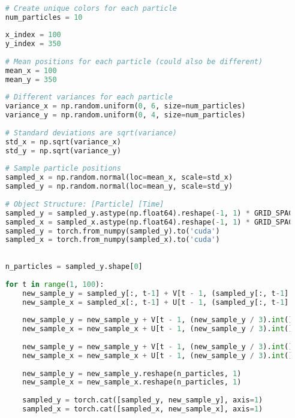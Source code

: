 \documentclass[11pt]{article}
\begin{document}
\begin{lstlisting}[language=Python, label=lst:debris-particles, caption={Simulating Random Debris Sampled from a Normal Gaussian Distribution with a Variety of Variances.}]

    # Create unique colors for each particle
    num_particles = 10
    
    x_index = 100
    y_index = 350
    
    # Mean positions for each particle (could also be different)
    mean_x = 100
    mean_y = 350
    
    # Different variances for each particle
    variance_x = np.random.uniform(0, 6, size=num_particles)
    variance_y = np.random.uniform(0, 4, size=num_particles)
    
    # Standard deviations are sqrt(variance)
    std_x = np.sqrt(variance_x)
    std_y = np.sqrt(variance_y)
    
    # Sample particle positions
    sampled_x = np.random.normal(loc=mean_x, scale=std_x)
    sampled_y = np.random.normal(loc=mean_y, scale=std_y)
    
    # Object Structure: [Particle] [Time]
    sampled_y = sampled_y.astype(np.float64).reshape(-1, 1) * GRID_SPACING_KM
    sampled_x = sampled_x.astype(np.float64).reshape(-1, 1) * GRID_SPACING_KM
    sampled_y = torch.from_numpy(sampled_y).to('cuda')
    sampled_x = torch.from_numpy(sampled_x).to('cuda')
    
    
    n_particles = sampled_y.shape[0]
    
    for t in range(1, 100):
        new_sample_y = sampled_y[:, t-1] + V[t - 1, (sampled_y[:, t-1] / 3).int(), (sampled_x[:, t-1] / 3).int()] # First Hour
        new_sample_x = sampled_x[:, t-1] + U[t - 1, (sampled_y[:, t-1] / 3).int(), (sampled_x[:, t-1] / 3).int()]
    
        new_sample_y = new_sample_y + V[t - 1, (new_sample_y / 3).int(), (new_sample_x / 3).int()] # Second Hour
        new_sample_x = new_sample_x + U[t - 1, (new_sample_y / 3).int(), (new_sample_x / 3).int()] # Second Hour
    
        new_sample_y = new_sample_y + V[t - 1, (new_sample_y / 3).int(), (new_sample_x / 3).int()] # Third Hour
        new_sample_x = new_sample_x + U[t - 1, (new_sample_y / 3).int(), (new_sample_x / 3).int()] # Third Hour
    
        new_sample_y = new_sample_y.reshape(n_particles, 1)
        new_sample_x = new_sample_x.reshape(n_particles, 1)
    
        sampled_y = torch.cat([sampled_y, new_sample_y], axis=1)
        sampled_x = torch.cat([sampled_x, new_sample_x], axis=1)
\end{lstlisting}
\end{document}
